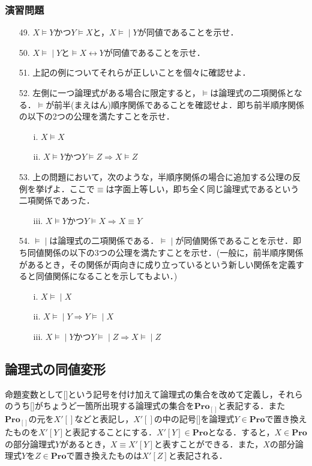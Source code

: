 \documentclass{ltjsarticle}
\theoremstyle{mystyle1}
\theoremstyle{mystyle2}
\newcommand{\bPro}{\ensuremath{\mathbf{Pro}}}
\newcommand{\lequiv}{\ensuremath{\models\!\mid}}
\begin{document}
\subsubsection*{演習問題}
\begin{enumerate}
  \item[49.] $X\models Y$かつ$Y\models X$と，$X\lequiv Y$が同値であることを示せ．
  \item[50.] $X\lequiv Y$と$\models X\leftrightarrow Y$が同値であることを示せ．
  \item[51.] 上記の例についてそれらが正しいことを個々に確認せよ．
  \item[52.] 左側に一つ論理式がある場合に限定すると，$\models$は論理式の二項関係となる．$\models$が前半(まえはん)順序関係であることを確認せよ．即ち前半順序関係の以下の2つの公理を満たすことを示せ．\begin{enumerate}
          \item[i.] $X\models X$
          \item[ii.] $X\models Y$かつ$Y\models Z\Rightarrow X\models Z$
        \end{enumerate}
  \item[53.] 上の問題において，次のような，半順序関係の場合に追加する公理の反例を挙げよ．ここで$\equiv$は字面上等しい，即ち全く同じ論理式であるという二項関係であった．\begin{enumerate}
          \item[iii.] $X\models Y$かつ$Y\models X\Rightarrow X\equiv Y$
        \end{enumerate}
  \item[54.] $\lequiv$は論理式の二項関係である．$\lequiv$が同値関係であることを示せ．即ち同値関係の以下の3つの公理を満たすことを示せ．(一般に，前半順序関係があるとき，その関係が両向きに成り立っているという新しい関係を定義すると同値関係になることを示してもよい．)\begin{enumerate}
          \item[i.] $X\lequiv X$
          \item[ii.] $X\lequiv Y\Rightarrow Y\lequiv X$
          \item[iii.] $X\lequiv Y$かつ$Y\lequiv Z\Rightarrow X\lequiv Z$
        \end{enumerate}
\end{enumerate}
\subsection{論理式の同値変形}
命題変数として[]という記号を付け加えて論理式の集合を改めて定義し，それらのうち[]がちょうど一箇所出現する論理式の集合を$\bPro_{[]}$と表記する．また$\bPro_{[]}$の元を$X'[]$などと表記し，$X'[]$の中の記号[]を論理式$Y\in\bPro$で置き換えたものを$X'[Y]$と表記することにする．$X'[Y]\in\bPro$となる．すると，$X\in\bPro$の部分論理式$Y$があるとき，$X \equiv X'[Y]$と表すことができる．また，$X$の部分論理式$Y$を$Z\in\bPro$で置き換えたものは$X'[Z]$と表記される．
\end{document}
